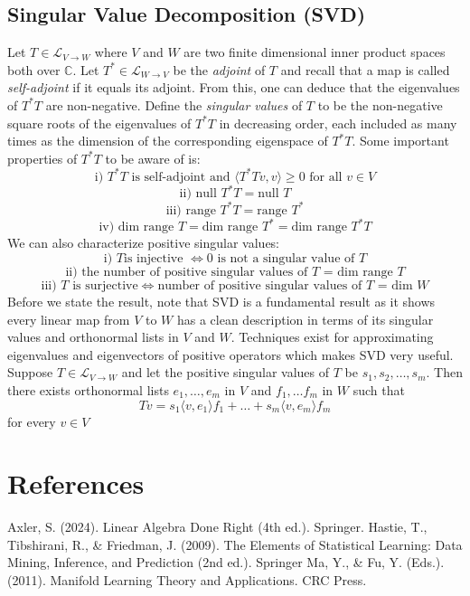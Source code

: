 \documentclass{article}
\begin{document}
\subsection{Singular Value Decomposition (SVD)}
Let $T \in \mathcal{L}_{V \to W}$ where $V$ and $W$ are two finite dimensional inner product spaces both over $\mathbb{C}$. Let $T^* \in \mathcal{L}_{W \to V}$ be the \emph{adjoint} of $T$ and recall that a map is called \emph{self-adjoint} 
if it equals its adjoint. From this, one can deduce that the eigenvalues of $T^*T$ are non-negative. \newline \newline 
Define the \emph{singular values} of $T$ to be the non-negative square roots of the eigenvalues of $T^*T$ in decreasing order, 
each included as many times as the dimension of the corresponding eigenspace of $T^*T$. Some important properties of $T^*T$ to be aware of is: 
$$
\text{i) }T^*T \text{ is self-adjoint and } \langle T^*Tv,v\rangle\geq 0 \text{ for all }v \in V
$$
$$
\text{ii) null } T^*T = \text{null } T
$$
$$
\text{iii) range }T^*T= \text{range }T^*
$$
$$
\text{iv) dim range }T = \text{dim range }T^* = \text{dim range }T^*T
$$
\newline \newline
We can also characterize positive singular values:
$$
\text{i) }T \text{is injective } \iff \text{0 is not a singular value of }T
$$
$$
\text{ii) the number of positive singular values of $T$ = dim range }T  
$$
$$
\text{iii) }T \text{ is surjective} \iff \text{number of positive singular values of $T$ = dim }W
$$
\newline \newline
Before we state the result, note that SVD is a fundamental result as it shows every linear map from $V$ to $W$ has a clean description in terms of its singular values
and orthonormal lists in $V$ and $W$. Techniques exist for approximating eigenvalues and eigenvectors of positive operators which makes SVD very useful.
\newline \newline
Suppose $T \in \mathcal{L}_{V \to W}$ and let the positive singular values of $T$ be $s_1, s_2, \ldots, s_m$. Then there exists 
orthonormal lists $e_1, \ldots, e_m$ in $V$ and $f_1, \ldots f_m$ in $W$ such that 
$$
Tv = s_1\langle v,e_1\rangle f_1+ \ldots + s_m \langle v,e_m\rangle f_m
$$
for every $v \in V$
\section{References}
Axler, S. (2024). Linear Algebra Done Right (4th ed.). Springer. \newline \newline
Hastie, T., Tibshirani, R., \& Friedman, J. (2009). The Elements of Statistical Learning: Data Mining, Inference, and Prediction (2nd ed.). Springer \newline \newline 
Ma, Y., \& Fu, Y. (Eds.). (2011). Manifold Learning Theory and Applications. CRC Press.
\end{document}
